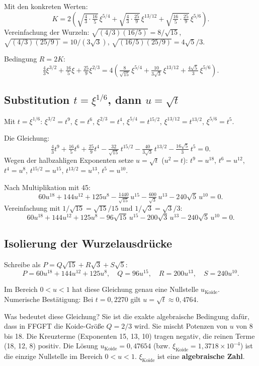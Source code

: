 Mit den konkreten Werten:
\[
  K = 2\!\left(
    \sqrt{\tfrac{4}{3}\cdot\tfrac{16}{5}}\,\xi^{5/4}
   +\sqrt{\tfrac{4}{3}\cdot\tfrac{25}{9}}\,\xi^{13/12}
   +\sqrt{\tfrac{16}{5}\cdot\tfrac{25}{9}}\,\xi^{5/6}
  \right).
\]
Vereinfachung der Wurzeln:
$\sqrt{(4/3)(16/5)}=8/\sqrt{15}$,
$\sqrt{(4/3)(25/9)}=10/(3\sqrt{3})$,
$\sqrt{(16/5)(25/9)}=4\sqrt{5}/3$.

Bedingung $R=2K$:
\[
  \tfrac{4}{3}\xi^{3/2}+\tfrac{16}{5}\xi+\tfrac{25}{9}\xi^{2/3}
  = 4\!\left(
    \tfrac{8}{\sqrt{15}}\,\xi^{5/4}
   +\tfrac{10}{3\sqrt{3}}\,\xi^{13/12}
   +\tfrac{4\sqrt{5}}{3}\,\xi^{5/6}
  \right).
\]

\subsection{Substitution $t=\xi^{1/6}$, dann $u=\sqrt{t}$}

Mit $t=\xi^{1/6}$:
$\xi^{3/2}=t^9$, $\xi=t^6$, $\xi^{2/3}=t^4$,
$\xi^{5/4}=t^{15/2}$, $\xi^{13/12}=t^{13/2}$, $\xi^{5/6}=t^5$.

Die Gleichung:
\[
  \tfrac{4}{3}t^9+\tfrac{16}{5}t^6+\tfrac{25}{9}t^4
  -\tfrac{32}{\sqrt{15}}\,t^{15/2}
  -\tfrac{40}{3\sqrt{3}}\,t^{13/2}
  -\tfrac{16\sqrt{5}}{3}\,t^5 = 0.
\]
Wegen der halbzahligen Exponenten setze $u=\sqrt{t}$ ($u^2=t$):
$t^9=u^{18}$, $t^6=u^{12}$, $t^4=u^8$,
$t^{15/2}=u^{15}$, $t^{13/2}=u^{13}$, $t^5=u^{10}$.

Nach Multiplikation mit 45:
\[
  60u^{18}+144u^{12}+125u^8
  -\tfrac{1440}{\sqrt{15}}\,u^{15}
  -\tfrac{600}{\sqrt{3}}\,u^{13}
  -240\sqrt{5}\,u^{10} = 0.
\]
Vereinfachung mit $1/\sqrt{15}=\sqrt{15}/15$ und $1/\sqrt{3}=\sqrt{3}/3$:
\[
  60u^{18}+144u^{12}+125u^8
  -96\sqrt{15}\,u^{15}
  -200\sqrt{3}\,u^{13}
  -240\sqrt{5}\,u^{10} = 0.
\]

\subsection{Isolierung der Wurzelausdrücke}

Schreibe als $P=Q\sqrt{15}+R\sqrt{3}+S\sqrt{5}$:
\[
  P=60u^{18}+144u^{12}+125u^8, \quad
  Q=96u^{15}, \quad R=200u^{13}, \quad S=240u^{10}.
\]

Im Bereich $0<u<1$ hat diese Gleichung genau eine Nullstelle $u_{\text{Koide}}$.
Numerische Bestätigung: Bei $t=0{,}2270$ gilt $u=\sqrt{t}\approx0{,}4764$.

Was bedeutet diese Gleichung?
Sie ist die exakte algebraische Bedingung dafür, dass in FFGFT die
Koide-Größe $Q=2/3$ wird.
Sie mischt Potenzen von $u$ von 8 bis 18.
Die Kreuzterme (Exponenten 15, 13, 10) tragen negativ,
die reinen Terme (18, 12, 8) positiv.
Die Lösung $u_{\text{Koide}}=0{,}47654$
(bzw. $\xi_{\text{Koide}}=1{,}3718\times10^{-4}$)
ist die einzige Nullstelle im Bereich $0<u<1$.
$\xi_{\text{Koide}}$ ist eine \textbf{algebraische Zahl}.

